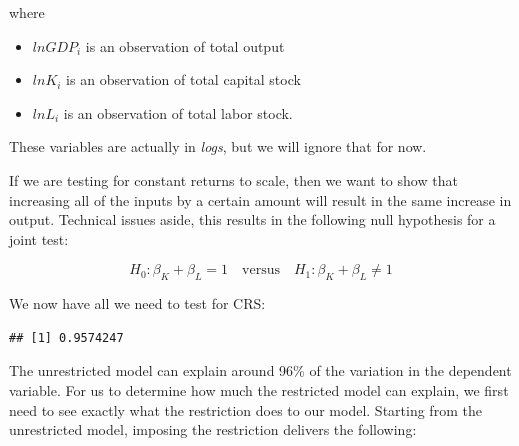 \documentclass[
]{book}
\newenvironment{Shaded}{\begin{snugshade}}{\end{snugshade}}
\newcommand{\AttributeTok}[1]{\textcolor[rgb]{0.77,0.63,0.00}{#1}}
\newcommand{\CommentTok}[1]{\textcolor[rgb]{0.56,0.35,0.01}{\textit{#1}}}
\newcommand{\FunctionTok}[1]{\textcolor[rgb]{0.00,0.00,0.00}{#1}}
\newcommand{\NormalTok}[1]{#1}
\newcommand{\OtherTok}[1]{\textcolor[rgb]{0.56,0.35,0.01}{#1}}
\newcommand{\SpecialCharTok}[1]{\textcolor[rgb]{0.00,0.00,0.00}{#1}}
\newcommand{\StringTok}[1]{\textcolor[rgb]{0.31,0.60,0.02}{#1}}
\begin{document}
where

\begin{itemize}
\item
  \(lnGDP_i\) is an observation of total output
\item
  \(lnK_i\) is an observation of total capital stock
\item
  \(lnL_i\) is an observation of total labor stock.
\end{itemize}

These variables are actually in \emph{logs}, but we will ignore that for now.

If we are testing for constant returns to scale, then we want to show that increasing all of the inputs by a certain amount will result in the same increase in output. Technical issues aside, this results in the following null hypothesis for a joint test:

\[H_0: \beta_K + \beta_L = 1 \quad \text{versus} \quad H_1: \beta_K + \beta_L \neq 1\]

We now have all we need to test for CRS:

\begin{Shaded}
\end{Shaded}

\begin{verbatim}
## [1] 0.9574247
\end{verbatim}

The unrestricted model can explain around 96\% of the variation in the dependent variable. For us to determine how much the restricted model can explain, we first need to see exactly what the restriction does to our model. Starting from the unrestricted model, imposing the restriction delivers the following:
\end{document}
